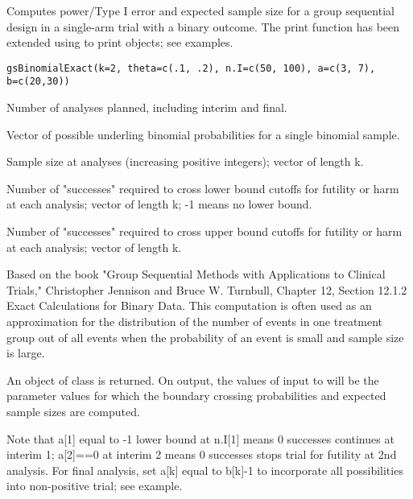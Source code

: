 \begin{Description}\relax
Computes power/Type I error and expected sample size for a group sequential design
in a single-arm trial with a binary outcome.
The print function has been extended using  to print  objects; see examples.
\end{Description}
\begin{Usage}
\begin{verbatim}
gsBinomialExact(k=2, theta=c(.1, .2), n.I=c(50, 100), a=c(3, 7), b=c(20,30))
\end{verbatim}
\end{Usage}
\begin{Arguments}
\begin{ldescription}
\item[\code{k}] Number of analyses planned, including interim and final.
\item[\code{theta}] Vector of possible underling binomial probabilities for a single binomial sample.
\item[\code{n.I}] Sample size at analyses (increasing positive integers); vector of length k.
\item[\code{a}] Number of "successes" required to cross lower bound cutoffs for futility or harm at each analysis; vector of length k; -1 means no lower bound.
\item[\code{b}] Number of "successes" required to cross upper bound cutoffs for futility or harm at each analysis; vector of length k.
\end{ldescription}
\end{Arguments}
\begin{Details}\relax
Based on the book "Group Sequential Methods with Applications to Clinical Trials,"
Christopher Jennison and Bruce W. Turnbull, Chapter 12, Section 12.1.2 Exact Calculations for Binary Data.
This computation is often used as an approximation for the distribution of the number of events in one treatment group out of all events when the probability of an event is small and sample size is large.

An object of class  is returned.
On output, the values of  input to  will be the parameter values for which the boundary crossing probabilities and expected sample sizes are computed.

Note that a[1] equal to -1 lower bound at n.I[1] means 0 successes continues at interim 1; a[2]==0 at interim 2 means 0 successes stops trial for futility at 2nd analysis. 
For final analysis, set a[k] equal to b[k]-1 to incorporate all possibilities into non-positive trial; see example.
\end{Details}

